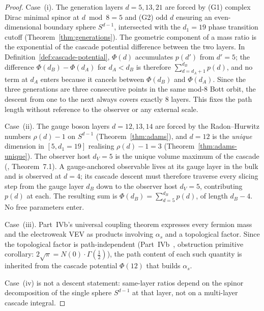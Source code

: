 \documentclass[12pt,a4paper]{article}
\begin{document}
\begin{proof}
Case~(i). The generation layers $d=5,13,21$ are forced by (G1) complex Dirac minimal spinor at $d\bmod 8=5$ and (G2) odd $d$ ensuring an even-dimensional boundary sphere $S^{d-1}$, intersected with the $d_1=19$ phase transition cutoff (Theorem~\ref{thm:generations}). The geometric component of a mass ratio is the exponential of the cascade potential difference between the two layers. In Definition~\ref{def:cascade-potential}, $\Phi(d)$ accumulates $p(d')$ from $d'=5$; the difference $\Phi(d_B)-\Phi(d_A)$ for $d_A<d_B$ is therefore $\sum_{d=d_A+1}^{d_B} p(d)$, and no term at $d_A$ enters because it cancels between $\Phi(d_B)$ and $\Phi(d_A)$. Since the three generations are three consecutive points in the same mod-8 Bott orbit, the descent from one to the next always covers exactly $8$ layers. This fixes the path length without reference to the observer or any external scale.

Case~(ii). The gauge boson layers $d=12,13,14$ are forced by the Radon--Hurwitz numbers $\rho(d)-1$ on $S^{d-1}$ (Theorem~\ref{thm:adams}), and $d=12$ is the \emph{unique} dimension in $[5,d_1=19]$ realising $\rho(d)-1=3$ (Theorem~\ref{thm:adams-unique}). The observer host $d_V=5$ is the unique volume maximum of the cascade (\cite{part0}, Theorem~7.1). A gauge-anchored observable lives at its gauge layer in the bulk and is observed at $d=4$; its cascade descent must therefore traverse every slicing step from the gauge layer $d_B$ down to the observer host $d_V=5$, contributing $p(d)$ at each. The resulting sum is $\Phi(d_B)=\sum_{d=5}^{d_B}p(d)$, of length $d_B-4$. No free parameters enter.

Case~(iii). Part~IVb's universal coupling theorem expresses every fermion mass and the electroweak VEV as products involving $\alpha_s$ and a topological factor. Since the topological factor is path-independent (Part~IVb~\cite{part4b}, obstruction primitive corollary: $2\sqrt{\pi}=N(0)\cdot\Gamma(\tfrac{1}{2})$), the path content of each such quantity is inherited from the cascade potential $\Phi(12)$ that builds $\alpha_s$.

Case~(iv) is not a descent statement: same-layer ratios depend on the spinor decomposition of the single sphere $S^{d-1}$ at that layer, not on a multi-layer cascade integral.
\end{proof}
\end{document}
